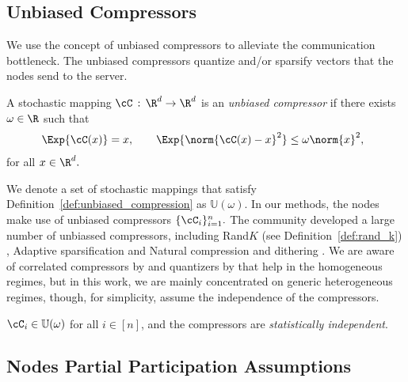 \documentclass{article}
\begin{document}
\subsection{Unbiased Compressors}
We use the concept of unbiased compressors to alleviate the communication bottleneck. The unbiased compressors quantize and/or sparsify vectors that the nodes send to the server.
\begin{definition}
    \label{def:unbiased_compression}
    A stochastic mapping $\cC\,:\,\R^d \rightarrow \R^d$ is an \textit{unbiased compressor} if
    there exists $\omega \in \R$ such that
    \begin{align}
        \label{eq:compressor}
        \hspace{-0.2cm}\Exp{\cC(x)} = x, \qquad \Exp{\norm{\cC(x) - x}^2} \leq \omega \norm{x}^2,
    \end{align}
    for all $x \in \R^d.$
\end{definition}
We denote a set of stochastic mappings that satisfy Definition~\ref{def:unbiased_compression} as $\mathbb{U}(\omega).$
In our methods, the nodes make use of unbiased compressors $\{\cC_i\}_{i=1}^n.$ 
The community developed a large number of unbiassed compressors, including Rand$K$ (see Definition~\ref{def:rand_k}) \citep{beznosikov2020biased, stich2018sparsified}, Adaptive sparsification \citep{wangni2018gradient} and Natural compression and dithering \citep{horvath2019natural}. We are aware of correlated compressors by \cite{szlendak2021permutation} and quantizers by \cite{suresh2022correlated} that help in the homogeneous regimes, but in this work, we are mainly concentrated on generic heterogeneous regimes, though, for simplicity, assume the independence of the compressors.
\begin{assumption}
\label{ass:compressors}
 $\cC_i \in \mathbb{U}(\omega)$ for all $i\in [n]$, and the compressors are \textit{statistically independent}.
\end{assumption}

\subsection{Nodes Partial Participation Assumptions}
\label{sec:partial_participation}

\newcommand\Item[1][]{%
  \ifx\relax#1\relax  \item \else \item[#1] \fi
  \abovedisplayskip=0pt\abovedisplayshortskip=0pt~\vspace*{-\baselineskip}}
\end{document}
